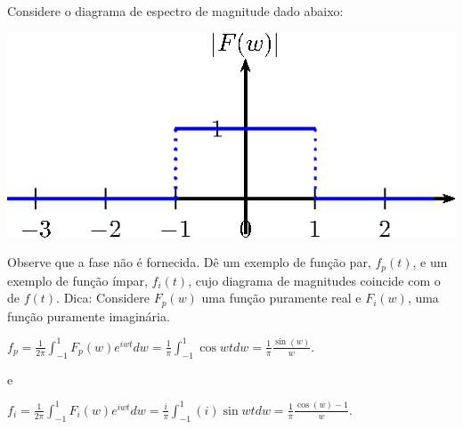 \begin{exer}Considere o diagrama de espectro de magnitude dado abaixo:
    \begin{center}
    \includegraphics{cap_diagramas_espectro_transformada/pics/figura_6}
    \end{center}        
    Observe que a fase não é fornecida. Dê um exemplo de função par, $f_p(t)$, e um exemplo de função ímpar, $f_i(t)$, cujo diagrama de magnitudes coincide com o de $f(t)$. Dica: Considere $F_p(w)$ uma função puramente real e $F_i(w)$, uma função puramente imaginária.
\end{exer}

\begin{resp}
    $f_p = \frac{1}{2\pi}\int_{-1}^1F_p(w)e^{iwt}dw=\frac{1}{\pi}\int_{-1}^1\cos{wt}dw=\frac{1}{\pi}\frac{\sin(w)}{w}.$
    
    e 
    
    $f_i = \frac{1}{2\pi}\int_{-1}^1F_i(w)e^{iwt}dw=\frac{i}{\pi}\int_{-1}^1(i)\sin{wt}dw=\frac{1}{\pi}\frac{\cos(w)-1}{w}.$
\end{resp}
